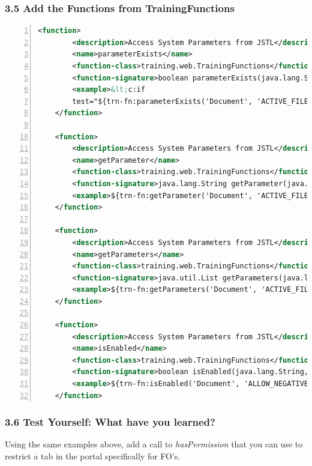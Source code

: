 \subsubsection*{3.5 Add the Functions from TrainingFunctions}
\begin{lstlisting}[basicstyle=\scriptsize,numbers=left,language=xml,backgroundcolor=\color{ubergray},caption={src/main/webapp/WEB-INF/tlds/trnfunc.tld
  Tag Library Definition},frame=single,breaklines=true]
    <function>
        <description>Access System Parameters from JSTL</description>
        <name>parameterExists</name>
        <function-class>training.web.TrainingFunctions</function-class>
        <function-signature>boolean parameterExists(java.lang.String, java.lang.String)</function-signature>
        <example>&lt;c:if
        test="${trn-fn:parameterExists('Document', 'ACTIVE_FILE_TYPES')}"&gt;&lt;/c:if&gt;</example>
    </function>

    <function>
        <description>Access System Parameters from JSTL</description>
        <name>getParameter</name>
        <function-class>training.web.TrainingFunctions</function-class>
        <function-signature>java.lang.String getParameter(java.lang.String, java.lang.String)</function-signature>
        <example>${trn-fn:getParameter('Document', 'ACTIVE_FILE_TYPES')}</example>
    </function>

    <function>
        <description>Access System Parameters from JSTL</description>
        <name>getParameters</name>
        <function-class>training.web.TrainingFunctions</function-class>
        <function-signature>java.util.List getParameters(java.lang.String, java.lang.String)</function-signature>
        <example>${trn-fn:getParameters('Document', 'ACTIVE_FILE_TYPES')}</example>
    </function>

    <function>
        <description>Access System Parameters from JSTL</description>
        <name>isEnabled</name>
        <function-class>training.web.TrainingFunctions</function-class>
        <function-signature>boolean isEnabled(java.lang.String, java.lang.String)</function-signature>
        <example>${trn-fn:isEnabled('Document', 'ALLOW_NEGATIVE_BALANCE_IND')}</example>
    </function>
\end{lstlisting}

\subsubsection*{3.6 Test Yourself: What have you learned?}
Using the same examples above, add a call to \emph{hasPermission} that
you can use to restrict a tab in the portal specifically for FO's.

